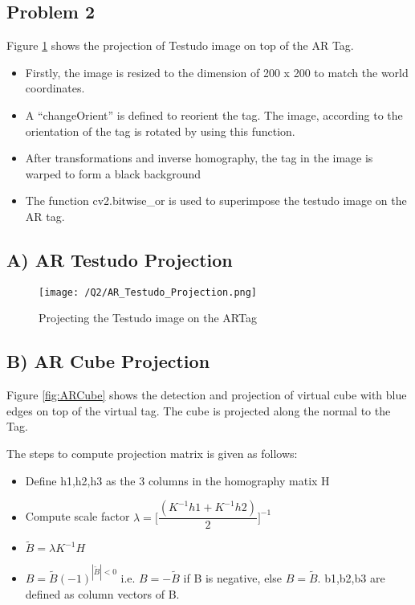\documentclass[a4paper, 10pt]{article}
\begin{document}
\begin{multicols}{2}
		
		\section{Problem 2}
		
		Figure \ref{fig:ARTag} shows the projection of Testudo image on top of the AR Tag. 
		
		\begin{itemize}
		\item Firstly, the image is resized to the dimension of 200 x 200 to match the world coordinates.
		\item A “changeOrient” is defined to reorient the tag. The image, according to the orientation of the tag is rotated by using this function.
		\item After transformations and inverse homography, the tag in the image is warped to form a black background
		\item The function cv2.bitwise\_or is used to superimpose the testudo image on the AR tag.
		\end{itemize}
	
		\subsection{A) AR Testudo Projection}
		\begin{figure}[H]
			\centering
			\texttt{[image: /Q2/AR\_Testudo\_Projection.png]}
			\caption{Projecting the Testudo image on the ARTag}
			\label{fig:ARTag}
		\end{figure}
		
		
		\subsection{B) AR Cube Projection}
		Figure \ref{fig:ARCube} shows the detection and projection of virtual cube with blue edges on top of the virtual tag. The cube is projected along the normal to the Tag.
		
		
		The steps to compute projection matrix is given as follows:
		\begin{itemize}
			\item Define h1,h2,h3 as the 3 columns in the homography
			matix H
			\item Compute scale factor $\lambda = \Big[ \dfrac{(K^{-1}h1 + K^{-1}h2)}{2}\Big]^{-1}$
			\item $\tilde{B} = \lambda K^{-1}H$ 
			\item $B = \tilde{B}(-1)^{|\tilde{B}|<0}$ i.e. $B = -\tilde{B}$ if B is negative, else $B = \tilde{B}$. b1,b2,b3 are defined as column vectors of B.
		\end{itemize}
		

\end{multicols}
\end{document}
